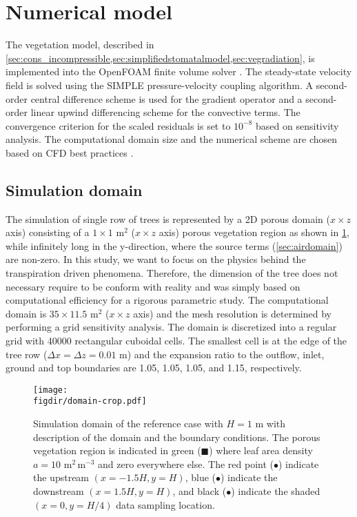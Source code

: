\section{Numerical model}
\label{sec:nummodel}

The vegetation model, described in \cref{sec:cons_incompressible,sec:simplifiedstomatalmodel,sec:vegradiation}, is implemented into the OpenFOAM finite volume solver \citep{Weller1998a}. The steady-state velocity field is solved using the SIMPLE pressure-velocity coupling algorithm. A second-order central difference scheme is used for the gradient operator and a second-order linear upwind differencing scheme for the convective terms. The convergence criterion for the scaled residuals is set to $10^{-8}$ based on sensitivity analysis. The computational domain size and the numerical scheme are chosen based on CFD best practices \citep{Blocken2015, Franke2007, Tominaga2008}.

\subsection{Simulation domain}
The simulation of single row of trees is represented by a 2D porous domain ($x\times z$ axis) consisting of a $1\times1$ m$^2$ ($x\times z$ axis) porous vegetation region as shown in \cref{fig:domain}, while infinitely long in the y-direction, where the source terms (\cref{sec:airdomain}) are non-zero. In this study, we want to focus on the physics behind the transpiration driven phenomena. Therefore, the dimension of the tree does not necessary require to be conform with reality and was simply based on computational efficiency for a rigorous parametric study. The computational domain is $35\times11.5$ m$^2$ ($x\times z$ axis) and the mesh resolution is determined by performing a grid sensitivity analysis. The domain is discretized into a regular grid with \num{40000} rectangular cuboidal cells. The smallest cell is at the edge of the tree row ($\Delta x = \Delta z = 0.01$ m) and the expansion ratio to the outflow, inlet, ground and top boundaries are 1.05, 1.05, 1.05, and 1.15, respectively. 

	\begin{figure}[p]
	\centering
	\texttt{[image: \\figdir/domain-crop.pdf]}
	\caption{Simulation domain of the reference case with $H=1$ m with description of the domain and the boundary conditions. The porous vegetation region is indicated in green ({\color{flatuidarkgreen}$\blacksquare$}) where leaf area density $a=10$ m$^2$\,m$^{-3}$ and zero everywhere else. The red point ({\color{flatuidarkred}$\bullet$}) indicate the upstream $(x=-1.5H,y=H)$, blue ({\color{flatuidarkblue}$\bullet$}) indicate the downstream $(x=1.5H,y=H)$, and black ($\bullet$) indicate the shaded $(x=0,y=H/4)$ data sampling location.}
	\label{fig:domain}
	\end{figure}

